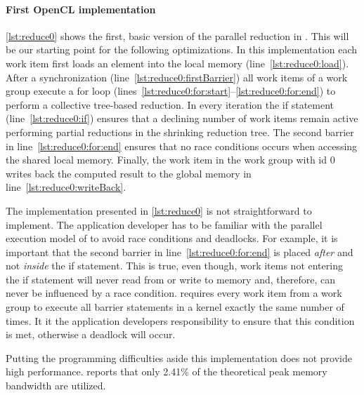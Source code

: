 \paragraph{First OpenCL implementation}
\autoref{lst:reduce0} shows the first, basic version of the parallel reduction in \OpenCL.
This will be our starting point for the following optimizations.
In this implementation each work item first loads an element into the local memory (line~\ref{lst:reduce0:load}).
After a synchronization (line~\ref{lst:reduce0:firstBarrier}) all work items of a work group execute a for loop (lines~\ref{lst:reduce0:for:start}--\ref{lst:reduce0:for:end}) to perform a collective tree-based reduction.
In every iteration the if statement (line~\ref{lst:reduce0:if}) ensures that a declining number of work items remain active performing partial reductions in the shrinking reduction tree.
The second barrier in line~\ref{lst:reduce0:for:end} ensures that no race conditions occurs when accessing the shared local memory.
Finally, the work item in the work group with id 0 writes back the computed result to the global memory in line~\ref{lst:reduce0:writeBack}.

The implementation presented in \autoref{lst:reduce0} is not straightforward to implement.
The application developer has to be familiar with the parallel execution model of \OpenCL to avoid race conditions and deadlocks.
For example, it is important that the second barrier in line~\ref{lst:reduce0:for:end} is placed \emph{after} and not \emph{inside} the if statement.
This is true, even though, work items not entering the if statement will never read from or write to memory and, therefore, can never be influenced by a race condition.
\OpenCL requires every work item from a work group to execute all barrier statements in a kernel exactly the same number of times.
It it the application developers responsibility to ensure that this condition is met, otherwise a deadlock will occur.

Putting the programming difficulties aside this implementation does not provide high performance.
\citeauthor{Harris2007} reports that only 2.41\% of the theoretical peak memory bandwidth are utilized. 

